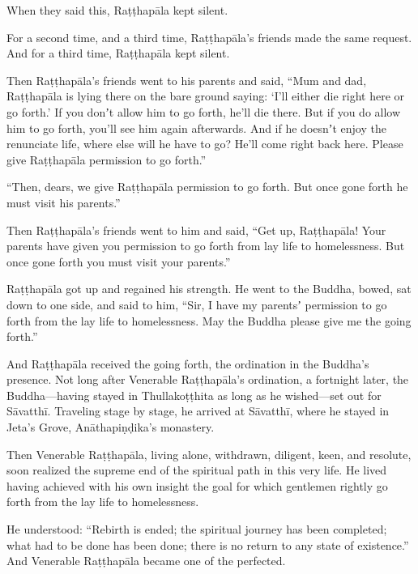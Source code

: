 \documentclass[12pt,openany]{book}%
\begin{document}
When they said this, \textsanskrit{Raṭṭhapāla} kept silent. 

For a second time, and a third time, \textsanskrit{Raṭṭhapāla}’s friends made the same request. And for a third time, \textsanskrit{Raṭṭhapāla} kept silent. 

Then \textsanskrit{Raṭṭhapāla}’s friends went to his parents and said, “Mum and dad, \textsanskrit{Raṭṭhapāla} is lying there on the bare ground saying: ‘I’ll either die right here or go forth.’ If you donʼt allow him to go forth, he’ll die there. But if you do allow him to go forth, you’ll see him again afterwards. And if he doesnʼt enjoy the renunciate life, where else will he have to go? He’ll come right back here. Please give \textsanskrit{Raṭṭhapāla} permission to go forth.” 

“Then, dears, we give \textsanskrit{Raṭṭhapāla} permission to go forth. But once gone forth he must visit his parents.” 

Then \textsanskrit{Raṭṭhapāla}’s friends went to him and said, “Get up, \textsanskrit{Raṭṭhapāla}! Your parents have given you permission to go forth from lay life to homelessness. But once gone forth you must visit your parents.” 

\textsanskrit{Raṭṭhapāla} got up and regained his strength. He went to the Buddha, bowed, sat down to one side, and said to him, “Sir, I have my parentsʼ permission to go forth from the lay life to homelessness. May the Buddha please give me the going forth.” 

And \textsanskrit{Raṭṭhapāla} received the going forth, the ordination in the Buddha’s presence. Not long after Venerable \textsanskrit{Raṭṭhapāla}’s ordination, a fortnight later, the Buddha—having stayed in \textsanskrit{Thullakoṭṭhita} as long as he wished—set out for \textsanskrit{Sāvatthī}. Traveling stage by stage, he arrived at \textsanskrit{Sāvatthī}, where he stayed in Jeta’s Grove, \textsanskrit{Anāthapiṇḍika}’s monastery. 

Then Venerable \textsanskrit{Raṭṭhapāla}, living alone, withdrawn, diligent, keen, and resolute, soon realized the supreme end of the spiritual path in this very life. He lived having achieved with his own insight the goal for which gentlemen rightly go forth from the lay life to homelessness. 

He understood: “Rebirth is ended; the spiritual journey has been completed; what had to be done has been done; there is no return to any state of existence.” And Venerable \textsanskrit{Raṭṭhapāla} became one of the perfected. 
\end{document}
